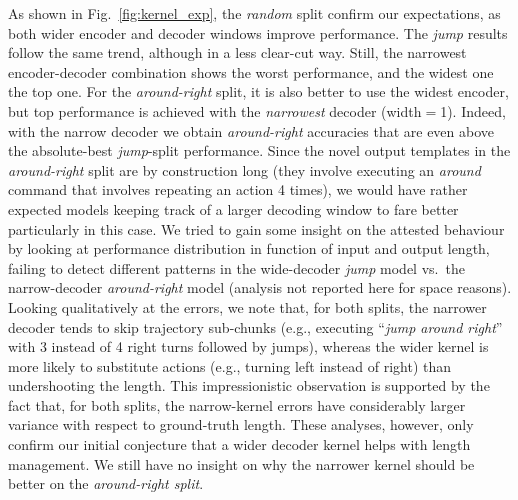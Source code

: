As shown in Fig.~\ref{fig:kernel_exp}, the \emph{random} split confirm
our expectations, as both wider encoder and decoder windows improve
performance. The \emph{jump} results follow the same trend, although
in a less clear-cut way. Still, the narrowest encoder-decoder
combination shows the worst performance, and the widest one the top
one. For the \emph{around-right} split, it is also better to use the
widest encoder, but top performance is achieved with the
\emph{narrowest} decoder (width$=$1). Indeed, with the narrow decoder
we obtain \emph{around-right} accuracies that are even above the
absolute-best \emph{jump}-split performance. Since the novel output
templates in the \emph{around-right} split are by construction long
(they involve executing an \emph{around} command that involves
repeating an action 4 times), we would have rather expected models
keeping track of a larger decoding window to fare better particularly
in this case. We tried to gain some insight on the attested behaviour
by looking at performance distribution in function of input and output
length, failing to detect different patterns in the wide-decoder
\emph{jump} model vs.~the narrow-decoder \emph{around-right} model
(analysis not reported here for space reasons). Looking qualitatively
at the errors, we note that, for both splits, the narrower decoder
tends to skip trajectory sub-chunks (e.g., executing ``\emph{jump around
right}'' with 3 instead of 4 right turns followed by jumps), whereas
the wider kernel is more likely to substitute actions (e.g., turning
left instead of right) than undershooting the length. This
impressionistic observation is supported by the fact that, for both
splits, the narrow-kernel errors have considerably larger variance
with respect to ground-truth length. These analyses, however, only confirm our
initial conjecture that a wider decoder kernel helps with length management.
We still have no insight on why the narrower kernel should be better on
the \emph{around-right split}.%
